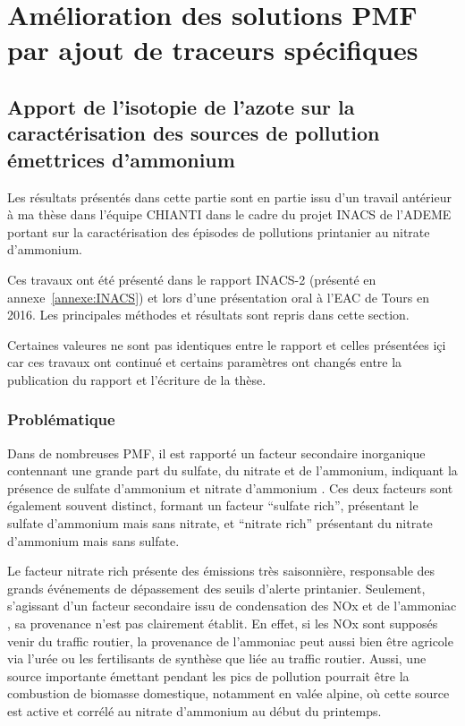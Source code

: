\section{Amélioration des solutions PMF par ajout de traceurs spécifiques}%
\label{sec:amélioration_des_solutions_pmf}

\subsection{Apport de l'isotopie de l'azote sur la caractérisation des sources de pollution émettrices d’ammonium}%
\label{sub:isotopie}

Les résultats présentés dans cette partie sont en partie issu d'un travail antérieur à ma
thèse dans l'équipe CHIANTI dans le cadre du projet INACS de l'ADEME portant sur
la caractérisation des épisodes de pollutions printanier au nitrate d'ammonium.

Ces travaux ont été présenté dans le rapport INACS-2 (présenté en
annexe~\ref{annexe:INACS}) et lors d'une présentation oral à l'EAC de Tours en 2016. 
Les principales méthodes et résultats sont repris dans cette section.

\begin{tcolorbox}[colback=red!5!white,colframe=Melon,title=Note]
    Certaines valeures ne sont pas identiques entre le rapport et celles présentées içi
    car ces travaux ont continué et certains paramètres ont changés entre la publication
    du rapport et l'écriture de la thèse.
\end{tcolorbox}


\subsubsection{Problématique}%
\label{ssub:problématique}

Dans de nombreuses PMF, il est rapporté un facteur secondaire inorganique contennant une
grande part du sulfate, du nitrate et de l'ammonium, indiquant la présence de sulfate
d'ammonium  et nitrate d'ammonium . Ces deux facteurs sont
également souvent distinct, formant un facteur ``sulfate rich'', présentant le sulfate
d'ammonium mais sans nitrate, et ``nitrate rich'' présentant du nitrate d'ammonium mais
sans sulfate.

Le facteur nitrate rich présente des émissions très saisonnière, responsable des grands
événements de dépassement des seuils d'alerte printanier. Seulement, s'agissant d'un
facteur secondaire issu de condensation des NOx et de l'ammoniac , sa provenance
n'est pas clairement établit. En effet, si les NOx sont supposés venir du traffic routier,
la provenance de l'ammoniac peut aussi bien être agricole via l'urée ou les fertilisants de
synthèse que liée au traffic routier. Aussi, une source importante émettant pendant les
pics de pollution pourrait être la combustion de biomasse domestique, notamment en valée
alpine, où cette source est active et corrélé au nitrate d'ammonium au début du printemps.

